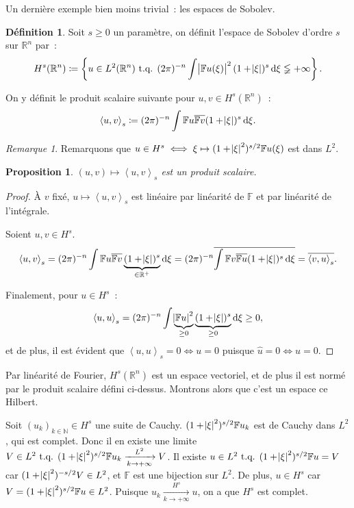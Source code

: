 \documentclass{report}
\newcommand{\R}{{\mathbb R}}
\newcommand{\N}{{\mathbb N}}
\newcommand{\scpr}[2]{\left\langle#1, #2\right\rangle}
\newcommand{\tq}{\text{ t.q. }}
\newcommand{\pinfty}{{+\infty}}
\newtheorem{prp}[thm]{Proposition}
\theoremstyle{definition}
\newtheorem{déf}[thm]{Définition}
\theoremstyle{remark}
\newtheorem*{rmq}{Remarque}
\begin{document}
Un dernière exemple bien moins trivial~: les espaces de Sobolev.

\begin{déf} Soit $s \geq 0$ un paramètre, on définit l'espace de Sobolev d'ordre $s$ sur $\R^n$ par~:
\begin{equation}
	H^s(\R^n) \coloneqq \left\{u \in L^2(\R^n) \tq (2\pi)^{-n}\int \abs {\mathbb Fu(\xi)}^2(1+\abs \xi)^s\dif\xi \lneqq \pinfty\right\}.
\end{equation}

On y définit le produit scalaire suivante pour $u, v \in H^s(\R^n)$~:
\begin{equation}
	\scpr uv_s \coloneqq (2\pi)^{-n}\int\mathbb Fu\overline {\mathbb Fv}(1+\abs\xi)^s\dif\xi.
\end{equation}
\end{déf}

\begin{rmq} Remarquons que $u \in H^s \iff \xi \mapsto (1+\abs \xi^2)^{s/2}\mathbb Fu(\xi)$ est dans $L^2$.
\end{rmq}


\begin{prp} $(u, v) \mapsto \scpr uv_s$ est un produit scalaire.
\end{prp}

\begin{proof} À $v$ fixé, $u \mapsto \scpr uv_s$ est linéaire par linéarité de $\mathbb F$ et par linéarité de l'intégrale.

Soient $u, v \in H^s$.
\[\scpr uv_s = (2\pi)^{-n}\int \mathbb Fu\overline {\mathbb Fv}\underbrace {(1+\abs \xi)^s}_{\in \R^+}\dif\xi
	= (2\pi)^{-n}\overline {\int \mathbb Fv\overline {\mathbb Fu}(1+\abs \xi)^s\dif\xi} = \overline {\scpr vu_s}.\]

Finalement, pour $u \in H^s$~:
\[\scpr uu_s = (2\pi)^{-n}\int\underbrace {\abs {\mathbb Fu}^2}_{\geq 0}\underbrace {(1+\abs\xi)^s}_{\geq 0}\dif\xi \geq 0,\]
et de plus, il est évident que $\scpr uu_s = 0 \iff u = 0$ puisque $\hat u = 0 \iff u = 0$.
\end{proof}

Par linéarité de Fourier, $H^s(\R^n)$ est un espace vectoriel, et de plus il est normé par le produit scalaire défini ci-dessus. Montrons alors que c'est un espace ce Hilbert.

Soit $(u_k)_{k \in \N} \in H^s$ une suite de Cauchy. $(1+\abs\xi^2)^{s/2}\mathbb Fu_k$ est de Cauchy dans $L^2$, qui est complet. Donc il en existe une limite
$V \in L^2 \tq (1+\abs\xi^2)^{s/2}\mathbb Fu_k \xrightarrow[k \to \pinfty]{L^2} V$. Il existe $u \in L^2 \tq (1+\abs\xi^2)^{s/2}\mathbb Fu = V$ car $(1+\abs\xi^2)^{-s/2}V \in L^2$,
et $\mathbb F$ est une bijection sur $L^2$. De plus, $u \in H^s$ car $V = (1+\abs\xi^2)^{s/2}\mathbb Fu \in L^2$. Puisque $u_k \xrightarrow[k \to \pinfty]{H^s} u$,
on a que $H^s$ est complet.
\end{document}
